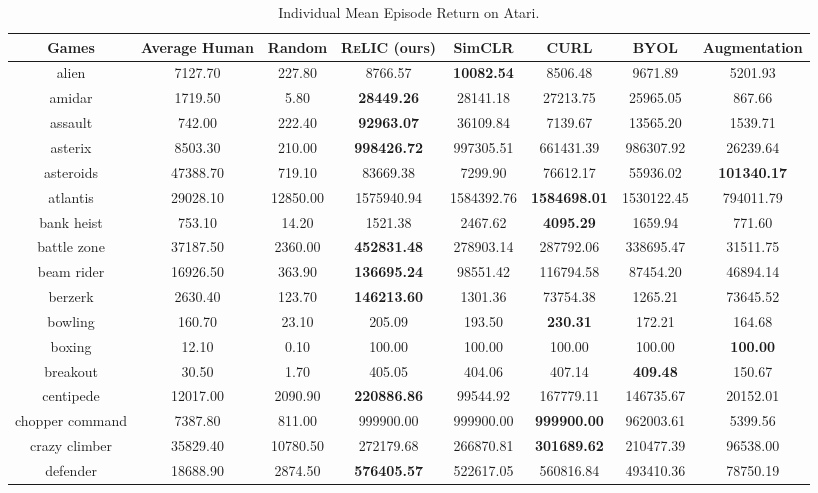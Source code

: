 \documentclass{article}
\newcommand{\relic}{\textsc{ReLIC}}
\begin{document}
\begin{table}[ht]
\tiny
  \caption{Individual Mean Episode Return on Atari.}
  \centering
   \vspace{0.2cm}
\begin{tabular}{|c|c|c|c|c|c|c|c|}
\hline
 Games & Average Human & Random & \relic{} (ours) & SimCLR & CURL & BYOL & Augmentation \\
\hline
 alien & 7127.70 & 227.80 & 8766.57 & \bf{10082.54} & 8506.48 & 9671.89 & 5201.93 \\
 amidar & 1719.50 & 5.80 & \bf{28449.26} & 28141.18 & 27213.75 & 25965.05 & 867.66 \\
 assault & 742.00 & 222.40 & \bf{92963.07} & 36109.84 & 7139.67 & 13565.20 & 1539.71 \\
 asterix & 8503.30 & 210.00 & \bf{998426.72} & 997305.51 & 661431.39 & 986307.92 & 26239.64 \\
 asteroids & 47388.70 & 719.10 & 83669.38 & 7299.90 & 76612.17 & 55936.02 & \bf{101340.17} \\
 atlantis & 29028.10 & 12850.00 & 1575940.94 & 1584392.76 & \bf{1584698.01} & 1530122.45 & 794011.79 \\
 bank heist & 753.10 & 14.20 & 1521.38 & 2467.62 & \bf{4095.29} & 1659.94 & 771.60 \\
 battle zone & 37187.50 & 2360.00 & \bf{452831.48} & 278903.14 & 287792.06 & 338695.47 & 31511.75 \\
 beam rider & 16926.50 & 363.90 & \bf{136695.24} & 98551.42 & 116794.58 & 87454.20 & 46894.14 \\
 berzerk & 2630.40 & 123.70 & \bf{146213.60} & 1301.36 & 73754.38 & 1265.21 & 73645.52 \\
 bowling & 160.70 & 23.10 & 205.09 & 193.50 & \bf{230.31} & 172.21 & 164.68 \\
 boxing & 12.10 & 0.10 & 100.00 & 100.00 & 100.00 & 100.00 & \bf{100.00} \\
 breakout & 30.50 & 1.70 & 405.05 & 404.06 & 407.14 & \bf{409.48} & 150.67 \\
 centipede & 12017.00 & 2090.90 & \bf{220886.86} & 99544.92 & 167779.11 & 146735.67 & 20152.01 \\
 chopper command & 7387.80 & 811.00 & 999900.00 & 999900.00 & \bf{999900.00} & 962003.61 & 5399.56 \\
 crazy climber & 35829.40 & 10780.50 & 272179.68 & 266870.81 & \bf{301689.62} & 210477.39 & 96538.00 \\
 defender & 18688.90 & 2874.50 & \bf{576405.57} & 522617.05 & 560816.84 & 493410.36 & 78750.19 \\

\end{tabular}
\end{table}
\end{document}
